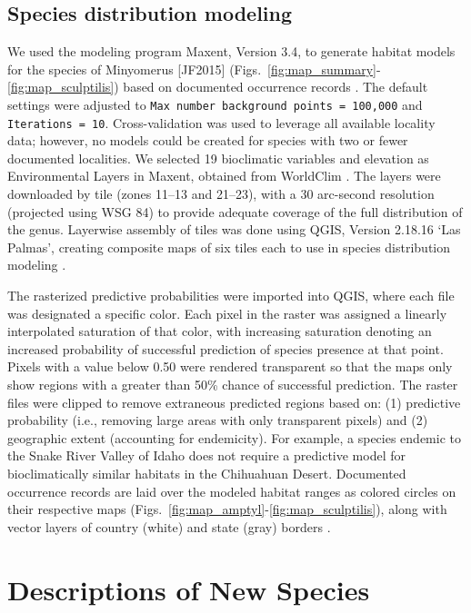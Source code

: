 \documentclass[fleqn,10pt,lineno]{wlpeerj} %
\begin{document}
	\subsection*{Species distribution modeling}\label{ssec:dismo} 
		We used the modeling program Maxent, Version 3.4, to generate habitat models for the species of Minyomerus [JF2015] (Figs.~\ref{fig:map_summary}-\ref{fig:map_sculptilis}) based on documented occurrence records \citep{phillips2004, phillips2006, elith2011}.
		The default settings were adjusted to \texttt{Max number background points = 100,000} and \texttt{Iterations = 10}.
		Cross-validation was used to leverage all available locality data; however, no models could be created for species with two or fewer documented localities.
		We selected 19 bioclimatic variables and elevation as Environmental Layers in Maxent, obtained from WorldClim \citep{hijmans2005}.
		The layers were downloaded by tile (zones 11–13 and 21–23), with a 30 arc-second resolution (projected using WSG 84) to provide adequate coverage of the full distribution of the genus.
		Layerwise assembly of tiles was done using QGIS, Version 2.18.16 `Las Palmas', creating composite maps of six tiles each to use in species distribution modeling \citep{qgis2018}.
		
		The rasterized predictive probabilities were imported into QGIS, where each file was designated a specific color. 
		Each pixel in the raster was assigned a linearly interpolated saturation of that color, with increasing saturation denoting an increased probability of successful prediction of species presence at that point.
		Pixels with a value below 0.50 were rendered transparent so that the maps only show regions with a greater than 50\% chance of successful prediction.
		The raster files were clipped to remove extraneous predicted regions based on: (1) predictive probability (i.e., removing large areas with only transparent pixels) and (2) geographic extent (accounting for endemicity).
		For example, a species endemic to the Snake River Valley of Idaho does not require a predictive model for bioclimatically similar habitats in the Chihuahuan Desert.
		Documented occurrence records are laid over the modeled habitat ranges as colored circles on their respective maps (Figs.~\ref{fig:map_amptyl}-\ref{fig:map_sculptilis}), along with vector layers of country (white) and state (gray) borders \citep{hijmans2012}.
		
\section*{Descriptions of New Species}\label{sec:nsp} 
\end{document}
